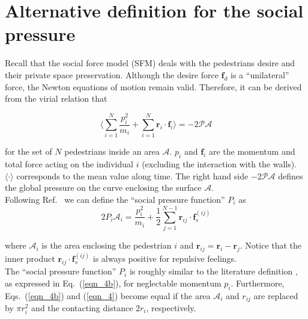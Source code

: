
\section{\label{alternative}Alternative definition for the social pressure}

Recall that the social force model (SFM) deals with the pedestrians desire and 
their private space preservation. Although the desire force 
$\mathbf{f}_d$ is a ``unilateral'' force, the Newton equations of 
motion remain valid. Therefore, it can be derived from the virial relation 
that \cite{lion}

\begin{equation}
 \bigg\langle\displaystyle\sum_{i=1}^N\displaystyle\frac{p_i^2}{m_i} + 
\displaystyle\sum_{i=1}^N 
\mathbf{r}_i\cdot\mathbf{f}_i\bigg\rangle=-2\mathcal{PA}\label{eqn_3}
\end{equation}


\noindent for the set of $N$ pedestrians inside an area $\mathcal{A}$. $p_i$  
and $\mathbf{f}_i$ are the momentum and total force acting on the individual 
$i$ 
(excluding the interaction with the walls). $\langle\cdot\rangle$ corresponds 
to 
the mean value along time. The right hand side $-2\mathcal{PA}$ defines the 
global pressure on the curve enclosing the surface $\mathcal{A}$.  \\

Following Ref.~\cite{lion} we can define the ``social pressure function'' $P_i$ 
as\\

\begin{equation}
2P_i\mathcal{A}_i=\displaystyle\frac{p_i^2}{m_i} + \frac{1}{2}
\displaystyle\sum_{j=1}^{N-1}
\mathbf{r}_{ij}\cdot\mathbf{f}_s^{(ij)}\label{eqn_4}
\end{equation}

\noindent where $\mathcal{A}_i$ is the area enclosing the pedestrian $i$ and 
$\mathbf{r}_{ij}=\mathbf{r}_{i}-\mathbf{r}_j$. Notice that the inner product 
$\mathbf{r}_{ij}\cdot\mathbf{f}_s^{(ij)}$ is always positive for repulsive 
feelings.  \\ 

The ``social pressure function'' $P_i$ is roughly similar to the literature 
definition \cite{Helbing1}, as expressed in Eq.~(\ref{eqn_4b}), for neglectable 
momentum $p_i$. Furthermore, Eqs.~(\ref{eqn_4b}) and (\ref{eqn_4}) become 
equal if the area $\mathcal{A}_i$ and $r_{ij}$ are replaced by $\pi r_i^2$ and 
the contacting distance $2r_i$, respectively. \\

